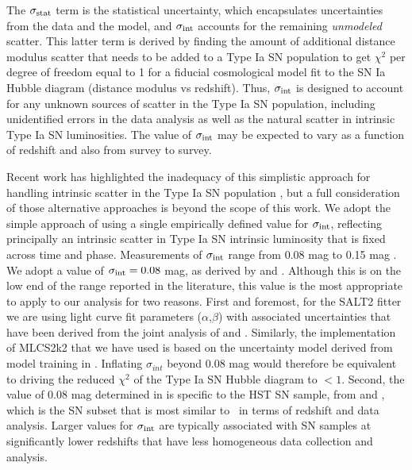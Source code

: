 \noindent
The $\sigma_{\rm stat}$ term is the statistical uncertainty, which
encapsulates uncertainties from the data and the model, and
$\sigma_{\rm int}$ accounts for the remaining {\it unmodeled} scatter.
This latter term is derived by finding the amount of additional
distance modulus scatter that needs to be added to a Type Ia SN
population to get $\chi^2$ per degree of freedom equal to 1 for a
fiducial cosmological model fit to the SN Ia Hubble diagram (distance
modulus vs redshift).  Thus, $\sigma_{\rm int}$ is designed to
account for any unknown sources of scatter in the Type Ia SN
population, including unidentified errors in the data analysis as well
as the natural scatter in intrinsic Type Ia SN luminosities.  The value of 
$\sigma_{\rm int}$ may be expected to vary as a function of
redshift and also from survey to survey.  

Recent work has highlighted the inadequacy of this simplistic approach
for handling intrinsic scatter in the Type Ia SN
population \citep{Marriner:2011,Kessler:2013,Mosher:2014,Scolnic:2014a,Betoule:2014},
but a full consideration of those alternative approaches is beyond the
scope of this work.  We adopt the simple approach of using a single
empirically defined value for $\sigma_{\rm int}$, reflecting
principally an intrinsic scatter in Type Ia SN intrinsic luminosity
that is fixed across time and phase.  Measurements of $\sigma_{\rm
int}$ range from 0.08 mag \citep{Jha:2007,Conley:2011} to 0.15
mag \citep{Kessler:2009b,Suzuki:2012}.  We adopt a value of
$\sigma_{\rm int}=0.08$ mag, as derived by \citet{Jha:2007}
and \citet{Conley:2011}.  Although this is on the low end of the range
reported in the literature, this value is the most appropriate to
apply to our analysis for two reasons.  First and foremost, for the
SALT2 fitter we are using light curve fit parameters
($\alpha$,$\beta$) with associated uncertainties that have been
derived from the joint analysis of \citet{Conley:2011}
and \citet{Sullivan:2011}. Similarly, the implementation of MLCS2k2
that we have used is based on the uncertainty model derived from model
training in \citet{Jha:2007}.  Inflating $\sigma_{int}$ beyond 0.08
mag would therefore be equivalent to driving the reduced $\chi^2$ of
the Type Ia SN Hubble diagram to $<1$.  Second, the value of 0.08 mag
determined in \citet{Conley:2011} is specific to the HST SN sample,
from \citet{Riess:2007} and \citet{Suzuki:2012}, which is the SN
subset that is most similar to \tomas\ in terms of redshift and data
analysis.  Larger values for $\sigma_{\rm int}$ are typically
associated with SN samples at significantly lower redshifts that have
less homogeneous data collection and analysis. 


